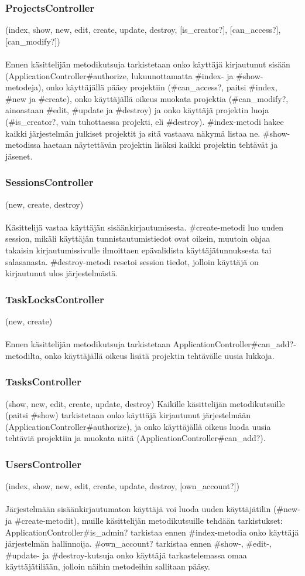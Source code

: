 \documentclass[12pt,a4paper]{article}
\begin{document}
\subsubsection*{ProjectsController}
(index, show, new, edit, create, update, destroy, [is\_creator?], [can\_access?],
[can\_modify?])\\\\
Ennen käsittelijän metodikutsuja tarkistetaan onko käyttäjä kirjautunut sisään
(ApplicationController\#authorize, lukuunottamatta \#index- ja \#show-metodeja), onko
käyttäjällä pääsy projektiin (\#can\_access?, paitsi \#index, \#new ja \#create), onko
käyttäjällä oikeus muokata projektia (\#can\_modify?, ainoastaan \#edit, \#update ja
\#destroy) ja onko käyttäjä projektin luoja (\#is\_creator?, vain tuhottaessa projekti, eli
\#destroy).
\#index-metodi hakee kaikki järjestelmän julkiset projektit ja sitä vastaava näkymä listaa ne.
\#show-metodissa haetaan näytettävän projektin lisäksi kaikki projektin tehtävät ja jäsenet.
\subsubsection*{SessionsController}
(new, create, destroy)\\\\
Käsittelijä vastaa käyttäjän sisäänkirjautumisesta.
\#create-metodi luo uuden session, mikäli käyttäjän tunnistautumistiedot ovat oikein,
muutoin ohjaa takaisin kirjautumissivulle ilmoittaen epävalidista käyttäjätunnuksesta tai
salasanasta.
\#destroy-metodi resetoi session tiedot, jolloin käyttäjä on kirjautunut ulos järjestelmästä.
\subsubsection*{TaskLocksController}
(new, create)\\\\
Ennen käsittelijän metodikutsuja tarkistetaan ApplicationController\#can\_add?-metodilta,
onko käyttäjällä oikeus lisätä projektin tehtävälle uusia lukkoja.
\subsubsection*{TasksController}
(show, new, edit, create, update, destroy)
Kaikille käsittelijän metodikutsuille (paitsi \#show) tarkistetaan onko käyttäjä kirjautunut
järjestelmään (ApplicationController\#authorize), ja onko käyttäjällä oikeus luoda uusia
tehtäviä projektiin ja muokata niitä (ApplicationController\#can\_add?).
\subsubsection*{UsersController}
(index, show, new, edit, create, update, destroy, [own\_account?])\\\\
Järjestelmään sisäänkirjautumaton käyttäjä voi luoda uuden käyttäjätilin (\#new- ja \#create-metodit),
muille käsittelijän metodikutsuille tehdään tarkistukset:
ApplicationController\#is\_admin? tarkistaa ennen \#index-metodia onko käyttäjä
järjestelmän hallinnoija. \#own\_account? tarkistaa ennen \#show-, \#edit-, \#update- ja \#destroy-kutsuja onko käyttäjä
tarkastelemassa omaa käyttäjätiliään, jolloin näihin metodeihin sallitaan pääsy.
\end{document}
